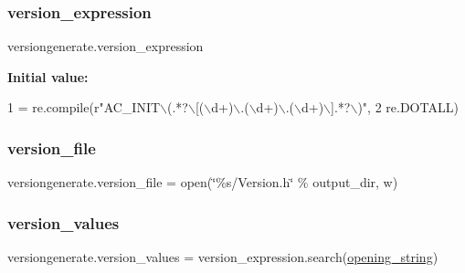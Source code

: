 \subsubsection{\texorpdfstring{version\+\_\+expression}{version\_expression}}
{\footnotesize\ttfamily versiongenerate.\+version\+\_\+expression}

{\bfseries Initial value\+:}
\begin{DoxyCode}
1 =  re.compile(\textcolor{stringliteral}{r"AC\_INIT\(\backslash\)(.*?\(\backslash\)[(\(\backslash\)d+)\(\backslash\).(\(\backslash\)d+)\(\backslash\).(\(\backslash\)d+)\(\backslash\)].*?\(\backslash\))"},
2                                 re.DOTALL)
\end{DoxyCode}
\mbox{\label{namespaceversiongenerate_a3cb3deeb1538014cd32e4253fe298e27}} 
\subsubsection{\texorpdfstring{version\+\_\+file}{version\_file}}
{\footnotesize\ttfamily versiongenerate.\+version\+\_\+file = open(\char`\"{}\%s/Version.\+h\char`\"{} \% output\+\_\+dir, \textquotesingle{}w\textquotesingle{})}

\mbox{\label{namespaceversiongenerate_a0ce22d4ba772e519b000413a3bf5445c}} 
\subsubsection{\texorpdfstring{version\+\_\+values}{version\_values}}
{\footnotesize\ttfamily versiongenerate.\+version\+\_\+values = version\+\_\+expression.\+search(\hyperlink{namespaceversiongenerate_a88cc36d80d757546e04817490ebb0640}{opening\+\_\+string})}

